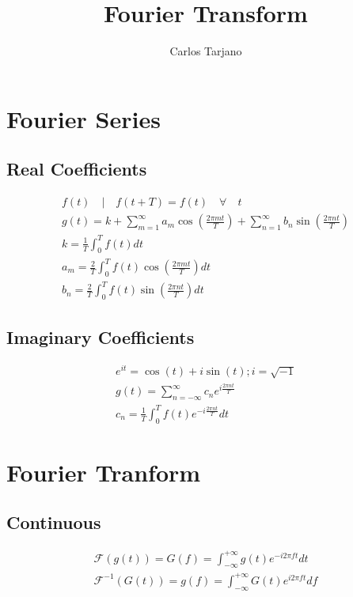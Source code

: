 \documentclass[10pt,a4paper]{article}
\author{Carlos Tarjano}
\title{Fourier Transform}
\begin{document}
\maketitle


\section{Fourier Series}
\subsection{Real Coefficients}
\begin{gather*}
f(t) \quad | \quad f(t+T)=f(t) \quad \forall \quad t\\
g(t) = 
k 
+ \sum_{m = 1}^{\infty} a_{m} \cos \left(\frac{2 \pi m t}{T}\right) 
+ \sum_{n = 1}^{\infty} b_{n} \sin \left(\frac{2 \pi n t}{T}\right) \\
k = \frac{1}{T} \int_{0}^{T} f(t) dt \\
a_{m} = \frac{2}{T} \int_{0}^{T} f(t) \cos \left(\frac{2 \pi m t}{T}\right) dt \\
b_{n} = \frac{2}{T} \int_{0}^{T} f(t) \sin \left(\frac{2 \pi n t}{T}\right) dt 
\end{gather*}


\subsection{Imaginary Coefficients}

\begin{gather*}
e^{it} = \cos(t) + i \sin(t) ; i = \sqrt{-1} \\
g(t) = \sum_{n = - \infty}^{\infty} c_{n} e^{i \frac{2 \pi n t}{T}} \\
c_{n} = \frac{1}{T} \int_{0}^{T} f(t) e^{-i \frac{2 \pi n t}{T}} dt
\end{gather*}


\section{Fourier Tranform}

\subsection{Continuous}

\begin{gather*}
\mathscr{F}(g(t)) = G(f) = \int_{-\infty}^{+\infty} g(t) e^{-i 2 \pi f t} dt\\
\mathscr{F}^{-1}(G(t)) = g(f) = \int_{-\infty}^{+\infty} G(t) e^{i 2 \pi f t} df
\end{gather*}
\end{document}

